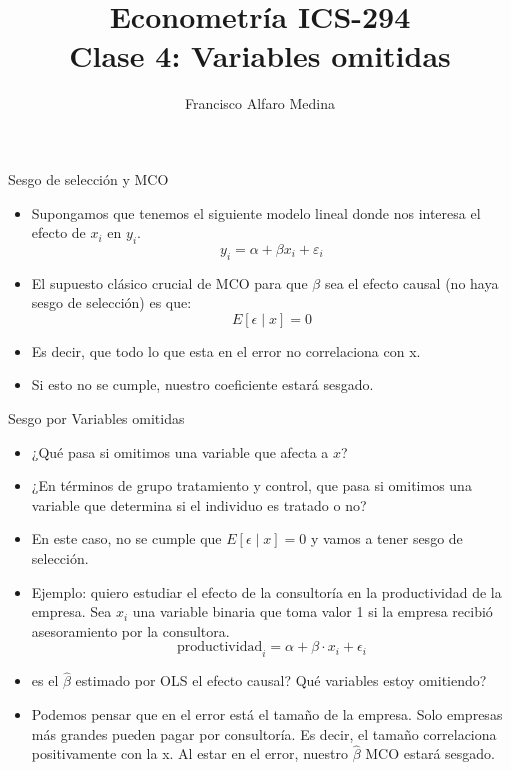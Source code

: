 \documentclass[10pt,aspectratio=169]{beamer}
\title[ICS-294]{Econometría ICS-294\\ \small{Clase 4: Variables omitidas}}
\author{Francisco Alfaro Medina}
\institute[USM]
{Universidad Técnica Federico Santa María\\ %
	\medskip
	\textit{} %
	
}
\date{}
\begin{document}
	
\begin{frame}
	\titlepage %
\end{frame}

\begin{frame}{Sesgo de selección y MCO}
    \begin{itemize}
               \item Supongamos que tenemos el siguiente modelo lineal donde nos interesa el efecto de $x_{i}$ en $y_{i}$.
        $$
        y_{i}=\alpha+\beta x_{i}+\varepsilon_{i}
        $$
        \item El supuesto cl\'asico crucial de MCO para que $\beta$ sea el efecto causal (no haya sesgo de selección) es que:
        $$
        E\left[\epsilon \mid x\right]=0
        $$
        \item Es decir, que todo lo que esta en el error no correlaciona con x.
        \item Si esto no se cumple, nuestro coeficiente estar\'a sesgado.
    \end{itemize}
\end{frame}

\begin{frame}{Sesgo por Variables omitidas}
    \begin{itemize} 
        \item ¿Qué pasa si omitimos una variable que afecta a $x$?
        \item ¿En t\'erminos de grupo tratamiento y control, que pasa si omitimos una variable que determina si el individuo es tratado o no?
        \item En este caso, no se cumple que $E\left[\epsilon \mid x\right]=0$ y vamos a tener sesgo de selecci\'on.
        \item Ejemplo: quiero estudiar el efecto de la consultor\'ia en la productividad de la empresa. Sea $x_{i}$ una variable binaria que toma valor 1 si la empresa recibi\'o asesoramiento por la consultora.
        $$
        \text{productividad}_{i}=\alpha+\beta \cdot x_{i}+\epsilon_{i}
        $$
        \item es el $\hat{\beta}$ estimado por OLS el efecto causal? Qu\'e variables estoy omitiendo?
        \item Podemos pensar que en el error est\'a el tamaño de la empresa. Solo empresas m\'as grandes pueden pagar por consultor\'ia. Es decir, el tamaño correlaciona positivamente con la x. Al estar en el error, nuestro $\hat{\beta}$ MCO estar\'a sesgado.
    \end{itemize}
\end{frame}
\end{document}
